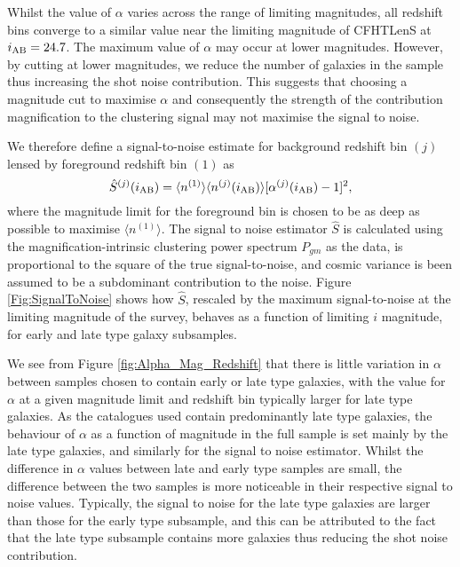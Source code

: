 \documentclass[useAMS,usenatbib,times,letter,amssymb]{mn2e}
\def\be{\begin{equation}}
\def\ee{\end{equation}}
\begin{document}
Whilst the value of $\alpha$ varies across the range of limiting magnitudes, all redshift bins converge to a similar value near the limiting magnitude of CFHTLenS at $i_{\rm AB} = 24.7$. The maximum value of $\alpha$ may occur at lower magnitudes. However, by cutting at lower magnitudes, we reduce the number of galaxies in the sample thus increasing the shot noise contribution. This suggests that choosing a magnitude cut to maximise $\alpha$ and consequently the strength of the contribution magnification to the clustering signal may not maximise the signal to noise. 

We therefore define a signal-to-noise estimate for background redshift bin $(j)$ lensed by foreground redshift bin $(1)$ as
\be\label{eqn:SignalToNoiseEst}
\hat{S}^{(j)}(i_{\rm AB}) = \langle n^{(1)} \rangle \langle n^{(j)}(i_{\rm AB})\rangle[\alpha^{(j)}(i_{\rm AB})-1]^2,
\ee
where the magnitude limit for the foreground bin is chosen to be as deep as possible to maximise $\langle n^{(1)}\rangle$. The signal to noise estimator $\hat{S}$ is calculated using the magnification-intrinsic clustering power spectrum $P_{gm}$ as the data, is proportional to the square of the true signal-to-noise, and cosmic variance is been assumed to be a subdominant contribution to the noise. %
Figure \ref{Fig:SignalToNoise} shows how $\hat{S}$, rescaled by the maximum signal-to-noise at the limiting magnitude of the survey, behaves as a function of limiting $i$ magnitude, for early and late type galaxy subsamples. 

We see from Figure \ref{fig:Alpha_Mag_Redshift} that there is little variation in $\alpha$ between samples chosen to contain early or late type galaxies, with the value for $\alpha$ at a given magnitude limit and redshift bin typically larger for late type galaxies. As the catalogues used contain predominantly late type galaxies, the behaviour of $\alpha$ as a function of magnitude in the full sample is set mainly by the late type galaxies, and similarly for the signal to noise estimator. Whilst the difference in $\alpha$ values between late and early type samples are small, the difference between the two samples is more noticeable in their respective signal to noise values. Typically, the signal to noise for the late type galaxies are larger than those for the early type subsample, and this can be attributed to the fact that the late type subsample contains more galaxies thus reducing the shot noise contribution. %
\end{document}
